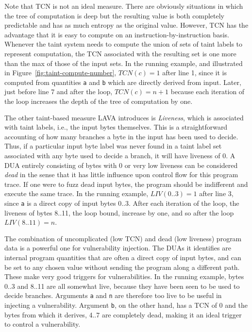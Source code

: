 Note that TCN is not an ideal measure.
There are obviously situations in which the tree of computation is deep but the resulting value is both completely predictable and has as much entropy as the original value.
However, TCN has the advantage that it is easy to compute on an instruction-by-instruction basis.
Whenever the taint system needs to compute the union of sets of taint labels to represent computation, the TCN associated with the resulting set is one more than the max of those of the input sets.
In the running example, and illustrated in Figure~\ref{fig:taint-compute-number}, $TCN(c)=1$ after line 1, since it is computed from quantities \verb+a+ and \verb+b+ which are directly derived from input.
Later, just before line 7 and after the loop, $TCN(c)=n+1$ because each iteration of the loop increases the depth of the tree of computation by one.  

The other taint-based measure LAVA introduces is \emph{Liveness}, which is associated with taint labels, i.e., the input bytes themselves.
This is a straightforward accounting of how many branches a byte in the input has been used to decide.
Thus, if a particular input byte label was never found in a taint label set associated with any byte used to decide a branch, it will have liveness of 0.
A DUA entirely consisting of bytes with 0 or very low liveness can be considered \emph{dead} in the sense that it has little influence upon control flow for this program trace.
If one were to fuzz dead input bytes, the program should be indifferent and execute the same trace.  
In the running example, $LIV(0..3)=1$ after line 3, since \verb+a+ is a direct copy of input bytes 0..3.
After each iteration of the loop, the liveness of bytes 8..11, the loop bound, increase by one, and so after the loop $LIV(8..11)=n$.

The combination of uncomplicated (low TCN) and dead (low liveness) program data is a powerful one for vulnerability injection.
The DUAs it identifies are internal program quantities that are often a direct copy of input bytes, and can be set to any chosen value without sending the program along a different path.  
These make very good triggers for vulnerabilities.
In the running example, bytes 0..3 and 8..11 are all somewhat live, because they have been seen to be used to decide branches.
Arguments \verb+a+ and \verb+n+ are therefore too live to be useful in injecting a vulnerability.
Argument \verb+b+, on the other hand, has a TCN of 0 and the bytes from which it derives, 4..7 are completely dead, 
making it an ideal trigger to control a vulnerability. 

